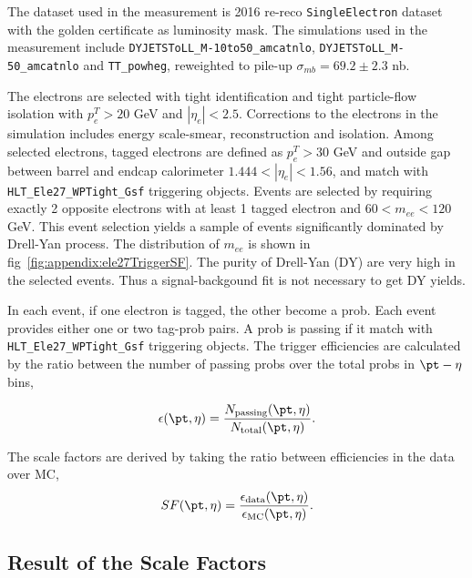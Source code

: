The dataset used in the measurement is 2016 re-reco \texttt{SingleElectron} dataset with the golden certificate as luminosity mask. The simulations used in the measurement include \texttt{DYJETSToLL\_M-10to50\_amcatnlo}, \texttt{DYJETSToLL\_M-50\_amcatnlo} and \texttt{TT\_powheg}, reweighted to pile-up $\sigma_{mb} = 69.2\pm 2.3$ nb.

The electrons are selected with tight identification and tight particle-flow isolation with $p^T_e>20$ GeV and $|\eta_e|<2.5$. Corrections to the electrons in the simulation includes energy scale-smear, reconstruction and isolation. Among selected electrons, tagged electrons are defined as $p^T_e>30$ GeV and outside gap between barrel and endcap calorimeter $1.444<|\eta_e|<1.56$, and match with \texttt{HLT\_Ele27\_WPTight\_Gsf} triggering objects. Events are selected by requiring exactly 2 opposite electrons with at least 1 tagged electron and $60<m_{ee}<120$ GeV. This event selection yields a sample of events significantly dominated by Drell-Yan process. The distribution of $m_{ee}$ is shown in fig~\ref{fig:appendix:ele27TriggerSF}. The purity of Drell-Yan (DY) are very high in the selected events. Thus a signal-backgound fit is not necessary to get DY yields.





In each event, if one electron is tagged, the other become a prob. Each event provides either one or two tag-prob pairs. A prob is passing if it match with \texttt{HLT\_Ele27\_WPTight\_Gsf} triggering objects. The trigger efficiencies are calculated by the ratio between the number of passing probs over the total probs in $\pt-\eta$ bins, 

\begin{equation}
    \epsilon (\pt, \eta) = \frac{ N_{\rm passing} (\pt, \eta) } {  N_{\rm total} (\pt, \eta) }.
\end{equation}

\noindent The scale factors are derived by taking the ratio between efficiencies in the data over MC,
\begin{equation}
SF (\pt, \eta) = \frac{\epsilon_{\rm{data}} (\pt, \eta) }{\epsilon_{\rm{MC}} (\pt, \eta) }.
\end{equation}



\subsection{Result of the Scale Factors}


